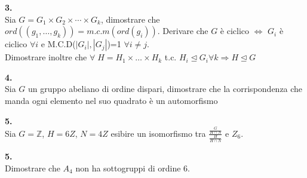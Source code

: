 \documentclass[italian,a4paper,11pt]
{article}
\newcommand{\Z}{\mathbb Z}
\newcommand{\sse}{\Leftrightarrow}
\newcommand{\acc}{\`}
\begin{document}
\vspace{0.4cm}
\noindent
\begin{Ex}\textbf{ 3.}\\
Sia $G=G_1 \times G_2 \times \cdots \times G_k$, dimostrare che $ord((g_1,\dots,g_k))=m.c.m(ord(g_i))$. Derivare che $G$ \`e ciclico $\sse$ $G_i$ \`e ciclico $\forall i$ e M.C.D($|G_i|,|G_j|$)=1 $\forall i\neq j$.\\
Dimostrare inoltre che $\forall \; H=H_1\times \dots \times H_k $ t.c. $ H_i \trianglelefteq G_i \forall k \Rightarrow H\trianglelefteq G$
\end{Ex}

\vspace{0.4cm}
\noindent
\begin{Ex}\textbf{ 4.}\\
Sia $G$ un gruppo abeliano di ordine dispari, dimostrare che la corrispondenza che manda ogni elemento nel suo quadrato \acc e un automorfismo
\end{Ex}


\vspace{0.4cm}
\noindent
\begin{Ex}\textbf{ 5.}\\
Sia $G=\Z$, $H=6Z$, $N=4Z$ esibire un isomorfismo tra $\frac{\frac{G}{H\cap N}}{\frac{H}{H\cap N}}$ e $Z_6$. 
\end{Ex}


\vspace{0.4cm}
\noindent
\begin{Ex}\textbf{ 5.}\\
Dimostrare che $A_4$ non ha sottogruppi di ordine 6.
\end{Ex}
\end{document}
